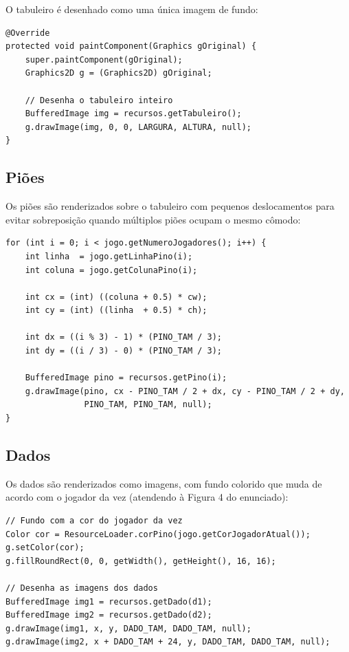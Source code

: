 \documentclass[12pt,a4paper]{report}
\begin{document}
O tabuleiro é desenhado como uma única imagem de fundo:

\begin{lstlisting}
@Override
protected void paintComponent(Graphics gOriginal) {
    super.paintComponent(gOriginal);
    Graphics2D g = (Graphics2D) gOriginal;

    // Desenha o tabuleiro inteiro
    BufferedImage img = recursos.getTabuleiro();
    g.drawImage(img, 0, 0, LARGURA, ALTURA, null);
}
\end{lstlisting}

\subsection{Piões}

Os piões são renderizados sobre o tabuleiro com pequenos deslocamentos para evitar sobreposição quando múltiplos piões ocupam o mesmo cômodo:

\begin{lstlisting}
for (int i = 0; i < jogo.getNumeroJogadores(); i++) {
    int linha  = jogo.getLinhaPino(i);
    int coluna = jogo.getColunaPino(i);

    int cx = (int) ((coluna + 0.5) * cw);
    int cy = (int) ((linha  + 0.5) * ch);

    int dx = ((i % 3) - 1) * (PINO_TAM / 3);
    int dy = ((i / 3) - 0) * (PINO_TAM / 3);

    BufferedImage pino = recursos.getPino(i);
    g.drawImage(pino, cx - PINO_TAM / 2 + dx, cy - PINO_TAM / 2 + dy,
                PINO_TAM, PINO_TAM, null);
}
\end{lstlisting}

\subsection{Dados}

Os dados são renderizados como imagens, com fundo colorido que muda de acordo com o jogador da vez (atendendo à Figura 4 do enunciado):

\begin{lstlisting}
// Fundo com a cor do jogador da vez
Color cor = ResourceLoader.corPino(jogo.getCorJogadorAtual());
g.setColor(cor);
g.fillRoundRect(0, 0, getWidth(), getHeight(), 16, 16);

// Desenha as imagens dos dados
BufferedImage img1 = recursos.getDado(d1);
BufferedImage img2 = recursos.getDado(d2);
g.drawImage(img1, x, y, DADO_TAM, DADO_TAM, null);
g.drawImage(img2, x + DADO_TAM + 24, y, DADO_TAM, DADO_TAM, null);
\end{lstlisting}
\end{document}
